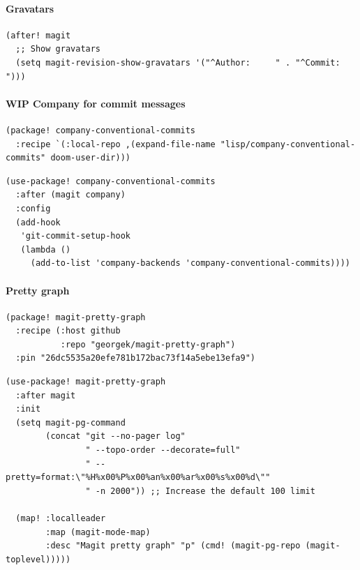 \documentclass[11pt]{article}
\begin{document}
\paragraph{Gravatars}
\label{sec:orgb303ca8}

\begin{verbatim}
(after! magit
  ;; Show gravatars
  (setq magit-revision-show-gravatars '("^Author:     " . "^Commit:     ")))
\end{verbatim}

\paragraph{WIP Company for commit messages}
\label{sec:orge61a98e}

\begin{verbatim}
(package! company-conventional-commits
  :recipe `(:local-repo ,(expand-file-name "lisp/company-conventional-commits" doom-user-dir)))
\end{verbatim}

\begin{verbatim}
(use-package! company-conventional-commits
  :after (magit company)
  :config
  (add-hook
   'git-commit-setup-hook
   (lambda ()
     (add-to-list 'company-backends 'company-conventional-commits))))
\end{verbatim}

\paragraph{Pretty graph}
\label{sec:orgd286485}

\begin{verbatim}
(package! magit-pretty-graph
  :recipe (:host github
           :repo "georgek/magit-pretty-graph")
  :pin "26dc5535a20efe781b172bac73f14a5ebe13efa9")
\end{verbatim}

\begin{verbatim}
(use-package! magit-pretty-graph
  :after magit
  :init
  (setq magit-pg-command
        (concat "git --no-pager log"
                " --topo-order --decorate=full"
                " --pretty=format:\"%H%x00%P%x00%an%x00%ar%x00%s%x00%d\""
                " -n 2000")) ;; Increase the default 100 limit

  (map! :localleader
        :map (magit-mode-map)
        :desc "Magit pretty graph" "p" (cmd! (magit-pg-repo (magit-toplevel)))))
\end{verbatim}
\end{document}

